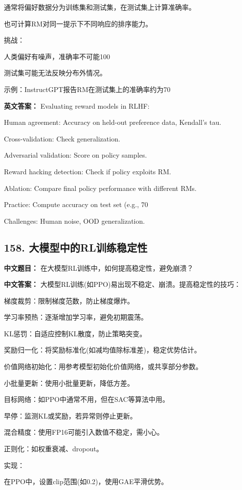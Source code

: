 \documentclass[10pt,a4paper]{ctexart}
\begin{document}
通常将偏好数据分为训练集和测试集，在测试集上计算准确率。

也可计算RM对同一提示下不同响应的排序能力。

挑战：

人类偏好有噪声，准确率不可能100%

测试集可能无法反映分布外情况。

示例：InstructGPT报告RM在测试集上的准确率约为70%

\textbf{英文答案：}
Evaluating reward models in RLHF:

Human agreement: Accuracy on held-out preference data, Kendall's tau.

Cross-validation: Check generalization.

Adversarial validation: Score on policy samples.

Reward hacking detection: Check if policy exploits RM.

Ablation: Compare final policy performance with different RMs.

Practice: Compute accuracy on test set (e.g., 70%

Challenges: Human noise, OOD generalization.

\subsection*{158. 大模型中的RL训练稳定性}
\textbf{中文题目：} 在大模型RL训练中，如何提高稳定性，避免崩溃？

\textbf{中文答案：}
大模型RL训练(如PPO)易出现不稳定、崩溃。提高稳定性的技巧：

梯度裁剪：限制梯度范数，防止梯度爆炸。

学习率预热：逐渐增加学习率，避免初期震荡。

KL惩罚：自适应控制KL散度，防止策略突变。

奖励归一化：将奖励标准化(如减均值除标准差)，稳定优势估计。

价值网络初始化：用参考模型初始化价值网络，或共享部分参数。

小批量更新：使用小批量更新，降低方差。

目标网络：如PPO中通常不用，但在SAC等算法中用。

早停：监测KL或奖励，若异常则停止更新。

混合精度：使用FP16可能引入数值不稳定，需小心。

正则化：如权重衰减、dropout。

实现：

在PPO中，设置clip范围(如0.2)，使用GAE平滑优势。
\end{document}
